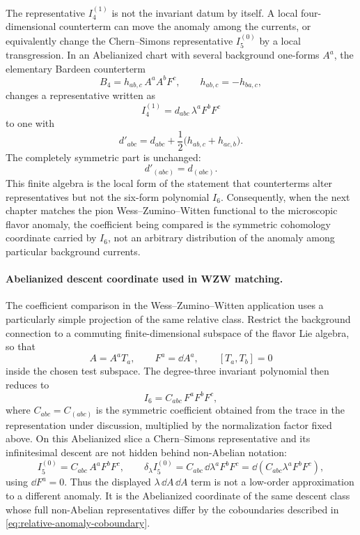 The representative \(I_4^{(1)}\) is not the invariant datum by itself.  A
local four-dimensional counterterm can move the anomaly among the currents,
or equivalently change the Chern--Simons representative \(I_5^{(0)}\) by a
local transgression.  In an Abelianized chart with several background
one-forms \(A^a\), the elementary Bardeen counterterm
\[
  B_4
  =
  h_{ab,c}\,A^aA^bF^c,
  \qquad h_{ab,c}=-h_{ba,c},
\]
changes a representative written as
\[
  I_4^{(1)}
  =
  d_{abc}\,\lambda^aF^bF^c
\]
to one with
\[
  d'_{abc}
  =
  d_{abc}
  +
  \frac12\bigl(h_{ab,c}+h_{ac,b}\bigr).
\]
The completely symmetric part is unchanged:
\[
  d'_{(abc)}=d_{(abc)}.
\]
This finite algebra is the local form of the statement that counterterms
alter representatives but not the six-form polynomial \(I_6\).  Consequently,
when the next chapter matches the pion Wess--Zumino--Witten functional to the
microscopic flavor anomaly, the coefficient being compared is the symmetric
cohomology coordinate carried by \(I_6\), not an arbitrary distribution of
the anomaly among particular background currents.

\paragraph{Abelianized descent coordinate used in WZW matching.}
\label{par:abelianized-descent-coordinate-wzw}
The coefficient comparison in the Wess--Zumino--Witten application uses a
particularly simple projection of the same relative class.  Restrict the
background connection to a commuting finite-dimensional subspace of the flavor
Lie algebra, so that
\[
  A=A^aT_a,\qquad F^a=\dd A^a,\qquad [T_a,T_b]=0
\]
inside the chosen test subspace.  The degree-three invariant polynomial then
reduces to
\[
  I_6
  =
  C_{abc}\,F^aF^bF^c,
\]
where \(C_{abc}=C_{(abc)}\) is the symmetric coefficient obtained from the
trace in the representation under discussion, multiplied by the normalization
factor fixed above.  On this Abelianized slice a Chern--Simons representative
and its infinitesimal descent are not hidden behind non-Abelian notation:
\begin{equation}
  I_5^{(0)}
  =
  C_{abc}\,A^aF^bF^c,
  \qquad
  \delta_\lambda I_5^{(0)}
  =
  C_{abc}\,\dd\lambda^a F^bF^c
  =
  \dd\!\left(C_{abc}\lambda^aF^bF^c\right),
  \label{eq:abelianized-cubic-descent-coordinate}
\end{equation}
using \(\dd F^a=0\).  Thus the displayed
\(\lambda\,\dd A\,\dd A\) term is not a low-order approximation to a
different anomaly.  It is the Abelianized coordinate of the same descent class
whose full non-Abelian representatives differ by the coboundaries described in
\eqref{eq:relative-anomaly-coboundary}.

